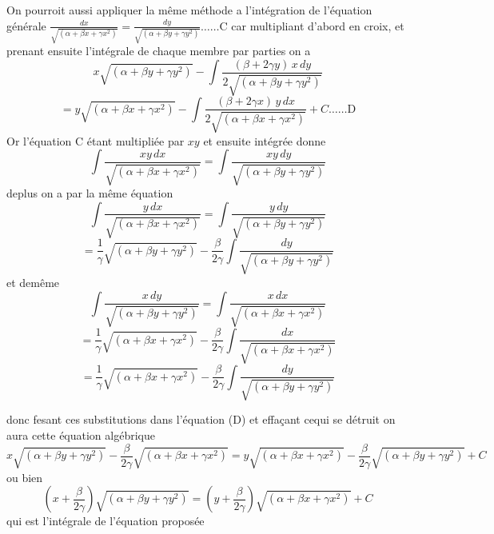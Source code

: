 \documentclass[11pt,a4paper]{article}
\begin{document}
On pourroit aussi appliquer la même méthode a l'intégration de
l'équation générale \quad $\frac{dx}{\sqrt{(\alpha + \beta x + \gamma x^{2})}} = \frac{dy}{\sqrt{(\alpha + \beta y + \gamma y^{2})}} \ldots\ldots \text{C}$
car multipliant d'abord en croix, et prenant ensuite l'intégrale de
chaque membre par parties on a
\[ x\sqrt{(\alpha + \beta y + \gamma y^{2})} - \int\frac{(\beta + 2\gamma y)\,x\,dy}{2\sqrt{(\alpha + \beta y + \gamma y^{2})}} \]
\[ = y\sqrt{(\alpha + \beta x + \gamma x^{2})} - \int\frac{(\beta + 2\gamma x)\,y\,dx}{2\sqrt{(\alpha + \beta x + \gamma x^{2})}} + C \ldots\ldots \text{D} \]
Or l'équation C étant multipliée par $xy$ et ensuite
intégrée donne
\[ \int\frac{xy\,dx}{\sqrt{(\alpha + \beta x + \gamma x^{2})}} = \int\frac{xy\,dy}{\sqrt{(\alpha + \beta y + \gamma y^{2})}} \]
deplus on a par la même équation
\[ \int\frac{y\,dx}{\sqrt{(\alpha + \beta x + \gamma x^{2})}} = \int\frac{y\,dy}{\sqrt{(\alpha + \beta y + \gamma y^{2})}} \]
\[ = \frac{1}{\gamma}\sqrt{(\alpha + \beta y + \gamma y^{2})} - \frac{\beta}{2\gamma}\int\frac{dy}{\sqrt{(\alpha + \beta y + \gamma y^{2})}} \]
et demême
\[ \int\frac{x\,dy}{\sqrt{(\alpha + \beta y + \gamma y^{2})}} = \int\frac{x\,dx}{\sqrt{(\alpha + \beta x + \gamma x^{2})}} \]
\[ = \frac{1}{\gamma}\sqrt{(\alpha + \beta x + \gamma x^{2})} - \frac{\beta}{2\gamma}\int\frac{dx}{\sqrt{(\alpha + \beta x + \gamma x^{2})}} \]
\[ = \frac{1}{\gamma}\sqrt{(\alpha + \beta x + \gamma x^{2})} - \frac{\beta}{2\gamma}\int\frac{dy}{\sqrt{(\alpha + \beta y + \gamma y^{2})}} \]

donc fesant ces substitutions dans l'équation (D) et effaçant
cequi se détruit on aura cette équation algébrique
\[ x\sqrt{(\alpha + \beta y + \gamma y^{2})} - \frac{\beta}{2\gamma}\sqrt{(\alpha + \beta x + \gamma x^{2})} = y\sqrt{(\alpha + \beta x + \gamma x^{2})} - \frac{\beta}{2\gamma}\sqrt{(\alpha + \beta y + \gamma y^{2})} + C \]
ou bien
\[ \left(x + \frac{\beta}{2\gamma}\right)\sqrt{(\alpha + \beta y + \gamma y^{2})} = \left(y + \frac{\beta}{2\gamma}\right)\sqrt{(\alpha + \beta x + \gamma x^{2})} + C \]
qui est l'intégrale de l'équation proposée
\end{document}
